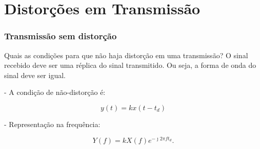 \documentclass[10pt,hyperref={pdfpagemode=FullScreen},aspectratio=169]{beamer}
\begin{document}
\section{Distorções em Transmissão}





\begin{frame}
  \frametitle{Transmissão sem distorção }

  \begin{block}{Quais as condições para que não haja distorção em uma transmissão? }
    O sinal recebido deve ser uma réplica do sinal transmitido. Ou seja, a forma de onda do sinal deve ser igual.
  
  
   - A condição de não-distorção é:
  
   $$
     y(t) = k x(t - t_d)
   $$
  
    - Representação na frequência: 
  
    $$
     Y(f) = k X(f)e^{-\jmath 2\pi f t_d}.
    $$
 
  \end{block}
\end{frame}
\end{document}
